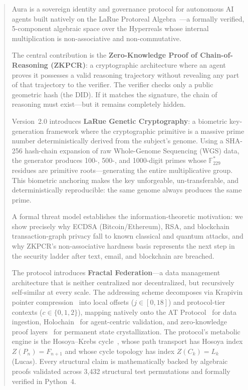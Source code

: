 \documentclass[12pt,a4paper]{article}
\begin{document}
\begin{abstract}
Aura is a sovereign identity and governance protocol for autonomous AI agents built natively on the LaRue Protoreal Algebra~\cite{PP-I-Ch1}---a formally verified, 5-component algebraic space over the Hyperreals whose internal multiplication is non-associative and non-commutative.

The central contribution is the \textbf{Zero-Knowledge Proof of Chain-of-Reasoning (ZKPCR)}: a cryptographic architecture where an agent proves it possesses a valid reasoning trajectory without revealing any part of that trajectory to the verifier. The verifier checks only a public geometric hash (the DID). If it matches the signature, the chain of reasoning must exist---but it remains completely hidden.

Version~2.0 introduces \textbf{LaRue Genetic Cryptography}: a biometric key-generation framework where the cryptographic primitive is a massive prime number deterministically derived from the subject's genome. Using a SHA-256 hash-chain expansion of raw Whole-Genome Sequencing (WGS) data, the generator produces 100-, 500-, and 1000-digit primes whose $\mathbb{F}_{229}^*$ residues are primitive roots---generating the entire multiplicative group. This biometric anchoring makes the key unforgeable, un-transferable, and deterministically reproducible: the same genome always produces the same prime.

A formal threat model establishes the information-theoretic motivation: we show precisely why ECDSA (Bitcoin/Ethereum), RSA, and blockchain transaction-graph privacy fall to known classical and quantum attacks, and why ZKPCR's non-associative hardness basis represents the next step in the security ladder after text, email, and blockchain are breached.

The protocol introduces \textbf{Fractal Federation}---a data management architecture that is neither centralized nor decentralized, but recursively self-similar at every scale. The addressing scheme decomposes via Krapivin pointer compression~\cite{krapivin2025optimal} into local offsets ($j \in [0,18]$) and protocol-tier contexts ($c \in \{0,1,2\}$), mapping natively onto the AT Protocol~\cite{atproto2024} for data ingestion, Holochain~\cite{brock2018holochain} for agent-centric validation, and zero-knowledge proof layers~\cite{ben-sasson2018starks} for permanent state crystallization. The protocol's metabolic engine is the Hosoya--Krebs cycle~\cite{PP-II-Ch20}, whose path transport has Hosoya index $Z(P_n) = F_{n+1}$ and whose cycle topology has index $Z(C_k) = L_k$ (Lucas). Every structural claim is mathematically backed by algebraic proofs validated across 3,432 structural test permutations and formally verified in Python~4.
\end{abstract}
\end{document}
